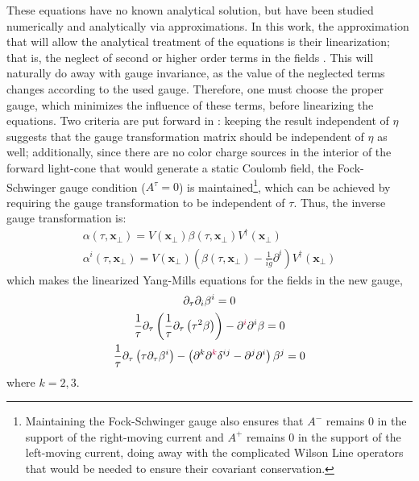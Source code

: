 These equations have no known analytical solution, but have been studied numerically and analytically via approximations. In this work, the approximation that will allow the analytical treatment of the equations is their linearization; that is, the neglect of second or higher order terms in the fields
. This  will naturally do away with gauge invariance, as the value of the neglected terms changes according to the used gauge. Therefore, one must choose the proper gauge, which minimizes the influence of these terms, before linearizing the equations. Two criteria are put forward in \cite{Guerrero_Rodr_guez_2021}: keeping the result independent of $\eta$ suggests that the gauge transformation matrix should be independent of $\eta$ as well; additionally, since there are no color charge sources in the interior of the forward light-cone that would generate a static Coulomb field,
the Fock-Schwinger gauge condition ($A^\tau = 0$) is maintained\footnote{Maintaining the Fock-Schwinger gauge also ensures that $A^-$ remains $0$ in the support of the right-moving current and $A^+$ remains $0$ in the support of the left-moving current, doing away with the complicated Wilson Line operators that would be needed to ensure their covariant conservation.}, which can be achieved by requiring the gauge transformation to be independent of $\tau$. Thus, the inverse gauge transformation is:
\begin{subequations}
\begin{gather}
	\alpha(\tau,\mathbf{x}_\perp) = V (\mathbf{x}_\perp) \beta(\tau,\mathbf{x}_\perp) V^\dagger (\mathbf{x}_\perp) \\
	\alpha^i(\tau,\mathbf{x}_\perp) = V (\mathbf{x}_\perp) \left( \beta(\tau,\mathbf{x}_\perp) - \frac{1}{ig} \partial^i \right) V^\dagger (\mathbf{x}_\perp)
\end{gather}
\end{subequations}
which makes the linearized Yang-Mills equations for the fields in the new gauge, 
\begin{subequations}
\begin{gather}
	\partial_\tau \partial_i \beta^i = 0 \\
	\frac{1}{\tau} \partial_\tau \left( \frac{1}{\tau} \partial_\tau \left( \tau^2 \beta \right) \right) - \partial^{\textcolor{purple}{i}} \partial^i \beta = 0 \\
	\frac{1}{\tau} \partial_\tau \left( \tau \partial_\tau \beta^i \right) - \left( \partial^k \partial^{\textcolor{purple}{k}} \delta^{i j} - \partial^j \partial^i \right) \beta^j =0
\end{gather}
\end{subequations}
where $k=2,3$. %

